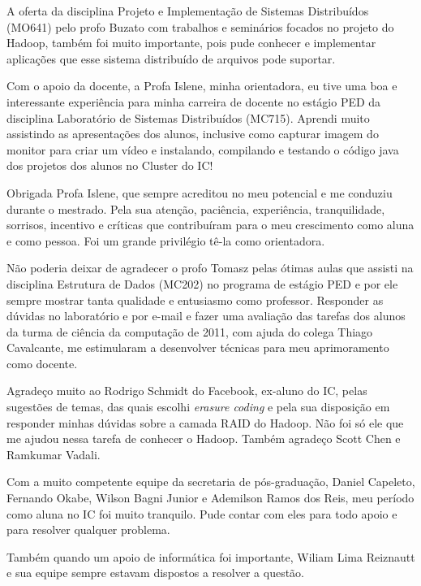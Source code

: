 A oferta da disciplina Projeto e Implementação de Sistemas Distribuídos (MO641) pelo profo Buzato com trabalhos e seminários focados no projeto do Hadoop, também foi muito importante, pois pude conhecer e implementar aplicações que esse sistema distribuído de arquivos pode suportar.

Com o apoio da docente, a Profa Islene, minha orientadora, eu tive uma boa e interessante experiência para minha carreira de docente no estágio PED da disciplina Laboratório de Sistemas Distribuídos (MC715). Aprendi muito assistindo as apresentações dos alunos, inclusive como capturar imagem do monitor para criar um vídeo e instalando, compilando e testando o código java dos projetos dos alunos no Cluster do IC!

Obrigada Profa Islene, que sempre acreditou no meu potencial e me conduziu durante o mestrado. Pela sua atenção, paciência, experiência, tranquilidade, sorrisos, incentivo e críticas que contribuíram para o meu crescimento como aluna e como pessoa. Foi um grande privilégio tê-la como orientadora.

Não poderia deixar de agradecer o profo Tomasz pelas ótimas aulas que assisti na disciplina Estrutura de Dados (MC202) no programa de estágio PED e por ele sempre mostrar tanta qualidade e entusiasmo como professor. Responder as dúvidas no laboratório e por e-mail e fazer uma avaliação das tarefas dos alunos da turma de ciência da computação de 2011, com ajuda do colega Thiago Cavalcante, me estimularam a desenvolver técnicas para meu aprimoramento como docente.

Agradeço muito ao Rodrigo Schmidt do Facebook, ex-aluno do IC, pelas sugestões de temas, das quais escolhi \emph{erasure coding} e pela sua disposição em responder minhas dúvidas sobre a camada RAID do Hadoop. Não foi só ele que me ajudou nessa tarefa de conhecer o Hadoop. Também agradeço Scott Chen e Ramkumar Vadali.

Com a muito competente equipe da secretaria de pós-graduação, Daniel Capeleto, Fernando Okabe, Wilson Bagni Junior e Ademilson Ramos dos Reis, meu período como aluna no IC foi muito tranquilo. Pude contar com eles para todo apoio e para resolver qualquer problema.

Também quando um apoio de informática foi importante, Wiliam Lima Reiznautt e sua equipe sempre estavam dispostos a resolver a questão.

